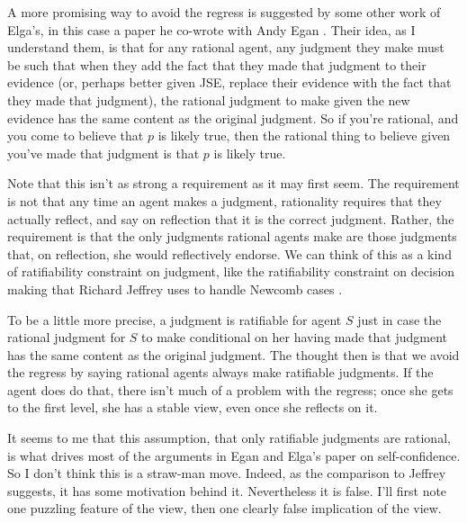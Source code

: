 A more promising way to avoid the regress is suggested by some other work of Elga's, in this case a paper he co-wrote with Andy Egan \citep{Egan2005-EGAICB}. Their idea, as I understand them, is that for any rational agent, any judgment they make must be such that when they add the fact that they made that judgment to their evidence (or, perhaps better given JSE, replace their evidence with the fact that they made that judgment), the rational judgment to make given the new evidence has the same content as the original judgment. So if you're rational, and you come to believe that \(p\) is likely true, then the rational thing to believe given you've made that judgment is that \(p\) is likely true.

Note that this isn't as strong a requirement as it may first seem. The requirement is not that any time an agent makes a judgment, rationality requires that they actually reflect, and say on reflection that it is the correct judgment. Rather, the requirement is that the only judgments rational agents make are those judgments that, on reflection, she would reflectively endorse. We can think of this as a kind of ratifiability constraint on judgment, like the ratifiability constraint on decision making that Richard Jeffrey uses to handle Newcomb cases \citet{JeffreyLogicOfDecision}.

To be a little more precise, a judgment is ratifiable for agent \(S\) just in case the rational judgment for \(S\) to make conditional on her having made that judgment has the same content as the original judgment. The thought then is that we avoid the regress by saying rational agents always make ratifiable judgments. If the agent does do that, there isn't much of a problem with the regress; once she gets to the first level, she has a stable view, even once she reflects on it. 

It seems to me that this assumption, that only ratifiable judgments are rational, is what drives most of the arguments in Egan and Elga's paper on self-confidence. So I don't think this is a straw-man move. Indeed, as the comparison to Jeffrey suggests, it has some motivation behind it. Nevertheless it is false. I'll first note one puzzling feature of the view, then one clearly false implication of the view.

